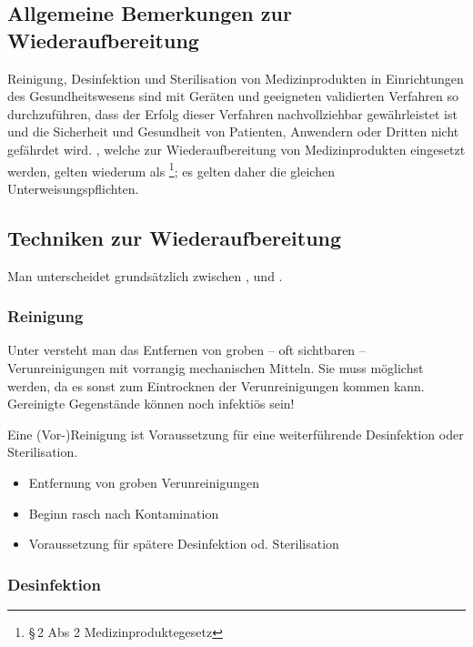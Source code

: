 \subsection{Allgemeine Bemerkungen zur Wiederaufbereitung}

Reinigung, Desinfektion und Sterilisation von Medizinprodukten in 
Einrichtungen des Gesundheitswesens sind mit Geräten und
geeigneten validierten Verfahren so durchzuführen, dass der Erfolg
dieser Verfahren nachvollziehbar gewährleistet ist und die Sicherheit und
Gesundheit von Patienten, Anwendern oder Dritten nicht gefährdet wird.
, welche zur Wiederaufbereitung von Medizinprodukten
eingesetzt werden, gelten wiederum als \footnote{{\S}\,2 Abs
2 Medizinproduktegesetz}; es gelten daher die gleichen Unterweisungspflichten.


\subsection{Techniken zur Wiederaufbereitung}

Man unterscheidet grundsätzlich zwischen ,  und 
.

\subsubsection{Reinigung}

{
Unter  versteht man das Entfernen von groben -- oft sichtbaren --
Verunreinigungen mit vorrangig mechanischen Mitteln. Sie muss
möglichst  werden, da es sonst zum
Eintrocknen der Verunreinigungen kommen kann. Gereinigte Gegenstände können
noch infektiös sein!

Eine (Vor-)Reinigung ist Voraussetzung für eine weiterführende Desinfektion
oder Sterilisation. 
}{
\begin{itemize}
  \item Entfernung von groben Verunreinigungen
  \item Beginn rasch nach Kontamination
  \item Voraussetzung für spätere Desinfektion od. Sterilisation
\end{itemize}
}{}{}{}



\subsubsection{Desinfektion}

